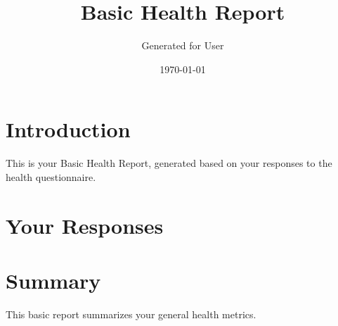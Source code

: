 \documentclass[a4paper,12pt]{article}
\title{Basic Health Report}
\author{Generated for User}
\date{\today}
\begin{document}
\maketitle

\section{Introduction}
This is your Basic Health Report, generated based on your responses to the health questionnaire.

\section{Your Responses}
\begin{itemize}

\end{itemize}

\section{Summary}
This basic report summarizes your general health metrics.
\end{document}
